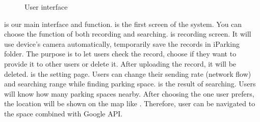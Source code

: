 \documentclass[runningheads,a4paper]{llncs}
\begin{document}
\begin{figure}[tbp]
{		\label{fig:userSetting}
	}
	\hspace{0.1in}
	\hspace{0.1in}
	\caption{User interface}
	\label{fig:userInterface}
\end{figure}

 is our main interface and function.
 is the first screen of the system. You
can choose the function of both recording and searching.
 is recording screen. It will use device's
camera automatically, temporarily save the records in iParking
folder. The purpose is to let users check the
record, choose if they want to provide it to other users or delete it. After
uploading the record, it will be deleted. 
is the setting page. Users can change their sending rate (network flow)
and searching range while finding parking space.
 is the result of searching. Users will know
how many parking spaces nearby. After choosing the one user prefers,
the location will be shown on the map like .
Therefore, user can be navigated to the space combined with Google API.
\end{document}
